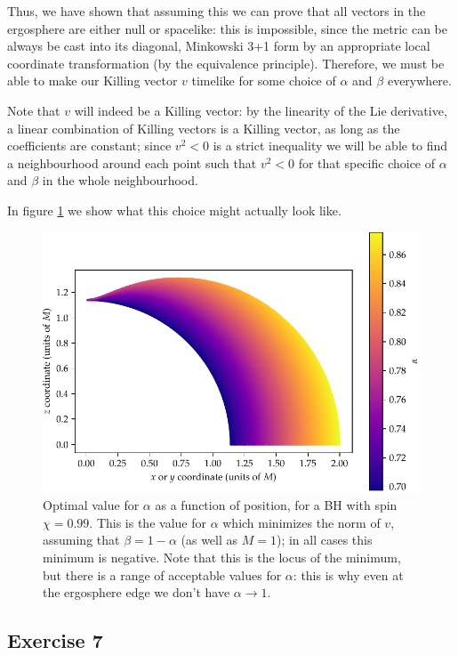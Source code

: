 \documentclass[main.tex]{subfiles}
\begin{document}
Thus, we have shown that assuming this we can prove that all vectors in the ergosphere are either null or spacelike: 
this is impossible, since the metric can be always be cast into its diagonal, Minkowski 3+1 form by an appropriate local coordinate transformation (by the equivalence principle).
Therefore, we must be able to make our Killing vector \(v\) timelike for some choice of \(\alpha \) and \(\beta \) everywhere.

Note that \(v\) will indeed be a Killing vector: by the linearity of the Lie derivative, a linear combination of Killing vectors is a Killing vector, as long as the coefficients are constant; since \(v^2 < 0\) is a strict inequality we will be able to find a neighbourhood around each point such that \(v^2 < 0\) for that specific choice of \(\alpha \) and \(\beta\) in the whole neighbourhood. 

In figure \ref{fig:kerr_killing} we show what this choice might actually look like.

\begin{figure}[ht]
\centering
\includegraphics[width=\textwidth]{figures/kerr_killing}
\caption{Optimal value for \(\alpha \) as a function of position, for a BH with spin \(\chi = 0.99\). This is the value for \(\alpha \) which minimizes the norm of \(v\), assuming that \(\beta = 1 - \alpha \) (as well as \(M = 1\)); in all cases this minimum is negative.
Note that this is the locus of the minimum, but there is a range of acceptable values for \(\alpha \): this is why even at the ergosphere edge we don't have \(\alpha \to 1\). }
\label{fig:kerr_killing}
\end{figure}

\subsection{Exercise 7}
\end{document}

